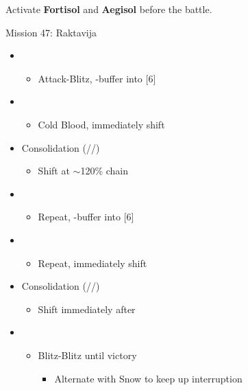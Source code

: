 \renewcommand{\third}{[3] Consolidation (\sen/\sen/\med)}

Activate \textbf{Fortisol} and \textbf{Aegisol} before the battle.

\begin{battle}{Mission 47: Raktavija}
	\begin{itemize}
		\item \first
			\begin{itemize}
				\item Attack-Blitz, \rav-buffer into [6]
			\end{itemize}
		\item \sixth
			\begin{itemize}
				\item Cold Blood, immediately shift
			\end{itemize}
		\item \third
			\begin{itemize}
				\item Shift at $\sim$120\% chain
			\end{itemize}
		\item \first
			\begin{itemize}
				\item Repeat, \rav-buffer into [6]
			\end{itemize}
		\item \sixth
			\begin{itemize}
				\item Repeat, immediately shift
			\end{itemize}	
		\item \third
			\begin{itemize}
				\item Shift immediately after \stagger
			\end{itemize}	
		\item \second
			\begin{itemize}
				\item Blitz-Blitz until victory
					\begin{itemize}
						\item Alternate with Snow to keep up interruption
					\end{itemize}
			\end{itemize}																			
	\end{itemize}
\end{battle}
\vfill

